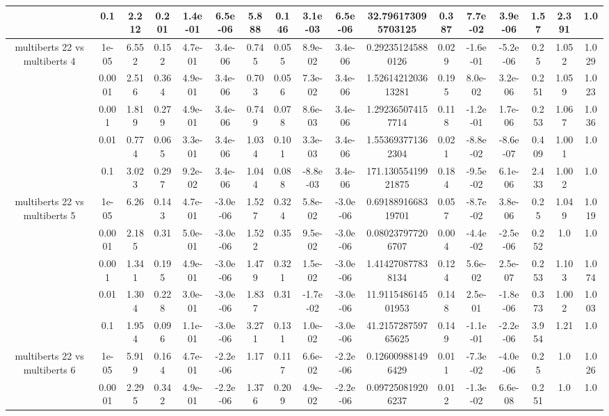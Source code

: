 \begin{tabular}{|c|c|c|c|c|c|c|c|c|c|c|c|c|c|c|c|c|}
 & 0.1 & 2.212 & 0.201 & 1.4e-01 & 6.5e-06 & 5.888 & 0.146 & 3.1e-03 & 6.5e-06 & 32.796173095703125 & 0.387 & 7.7e-02 & 3.9e-06 & 1.57 & 2.391 & 1.0 \\
\hline
\multirow{5}{*}{multiberts 22 vs multiberts 4} & 1e-05 & 6.552 & 0.152 & 4.7e-01 & 3.4e-06 & 0.745 & 0.055 & 8.9e-02 & 3.4e-06 & 0.292351245880126 & 0.029 & -1.6e-01 & -5.2e-06 & 0.25 & 1.052 & 1.029 \\
 & 0.0001 & 2.516 & 0.364 & 4.9e-01 & 3.4e-06 & 0.703 & 0.056 & 7.3e-02 & 3.4e-06 & 1.5261421203613281 & 0.195 & 8.0e-02 & 3.2e-06 & 0.251 & 1.059 & 1.023 \\
 & 0.001 & 1.819 & 0.279 & 4.9e-01 & 3.4e-06 & 0.749 & 0.078 & 8.6e-03 & 3.4e-06 & 1.292365074157714 & 0.118 & -1.2e-01 & 1.7e-06 & 0.253 & 1.067 & 1.036 \\
 & 0.01 & 0.774 & 0.065 & 3.3e-01 & 3.4e-06 & 1.034 & 0.101 & 3.3e-03 & 3.4e-06 & 1.553693771362304 & 0.021 & -8.8e-02 & -8.6e-07 & 0.409 & 1.001 & 1.0 \\
 & 0.1 & 3.023 & 0.297 & 9.2e-02 & 3.4e-06 & 1.044 & 0.088 & -8.8e-03 & 3.4e-06 & 171.13055419921875 & 0.184 & -9.5e-02 & 6.1e-06 & 2.433 & 1.002 & 1.0 \\
\hline
\multirow{5}{*}{multiberts 22 vs multiberts 5} & 1e-05 & 6.26 & 0.143 & 4.7e-01 & -3.0e-06 & 1.527 & 0.324 & 5.8e-02 & -3.0e-06 & 0.6918891668319701 & 0.057 & -8.7e-02 & 3.8e-06 & 0.25 & 1.049 & 1.019 \\
 & 0.0001 & 2.185 & 0.31 & 5.0e-01 & -3.0e-06 & 1.522 & 0.35 & 9.5e-02 & -3.0e-06 & 0.080237977206707 & 0.004 & -4.4e-02 & -2.5e-06 & 0.252 & 1.0 & 1.0 \\
 & 0.001 & 1.341 & 0.195 & 4.9e-01 & -3.0e-06 & 1.479 & 0.321 & 1.5e-02 & -3.0e-06 & 1.414270877838134 & 0.124 & 5.6e-02 & 2.5e-07 & 0.253 & 1.103 & 1.074 \\
 & 0.01 & 1.304 & 0.228 & 3.0e-01 & -3.0e-06 & 1.837 & 0.31 & -1.7e-02 & -3.0e-06 & 11.911548614501953 & 0.148 & 2.5e-01 & -1.8e-06 & 0.373 & 1.002 & 1.003 \\
 & 0.1 & 1.954 & 0.096 & 1.1e-01 & -3.0e-06 & 3.271 & 0.131 & 1.0e-02 & -3.0e-06 & 41.215728759765625 & 0.149 & -1.1e-01 & -2.2e-06 & 3.954 & 1.21 & 1.0 \\
\hline
\multirow{5}{*}{multiberts 22 vs multiberts 6} & 1e-05 & 5.919 & 0.164 & 4.7e-01 & -2.2e-06 & 1.17 & 0.117 & 6.6e-02 & -2.2e-06 & 0.126009881496429 & 0.011 & -7.3e-02 & -4.0e-06 & 0.25 & 1.0 & 1.026 \\
 & 0.0001 & 2.295 & 0.342 & 4.9e-01 & -2.2e-06 & 1.376 & 0.209 & 4.9e-02 & -2.2e-06 & 0.097250819206237 & 0.012 & -1.3e-02 & 6.6e-08 & 0.251 & 1.0 & 1.0 \\

\end{tabular}
